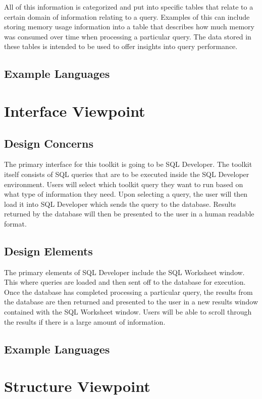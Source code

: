 \documentclass[draftclsnofoot, onecolumn, compsoc, 10pt]{IEEEtran}
\begin{document}
All of this information is categorized and put into specific tables that relate to a certain domain of information relating to a query.
Examples of this can include storing memory usage information into a table that describes how much memory was consumed over time when processing a particular query.
The data stored in these tables is intended to be used to offer insights into query performance.

\subsection{Example Languages}

\section{Interface Viewpoint}
\subsection{Design Concerns}
The primary interface for this toolkit is going to be SQL Developer. The toolkit itself consists of SQL queries that are to be executed inside the SQL Developer environment.
Users will select which toolkit query they want to run based on what type of information they need. Upon selecting a query, the user will then load it into SQL Developer which sends the query to the database.
Results returned by the database will then be presented to the user in a human readable format.
\subsection{Design Elements}
The primary elements of SQL Developer include the SQL Worksheet window.
This where queries are loaded and then sent off to the database for execution.
Once the database has completed processing a particular query, the results from the database are then returned and presented to the user in a new results window contained with the SQL Worksheet window.
Users will be able to scroll through the results if there is a large amount of information.

\subsection{Example Languages}

\section{Structure Viewpoint}
\end{document}
